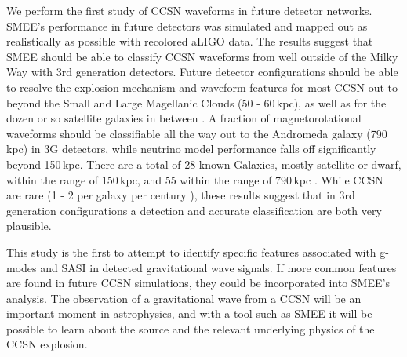 \documentclass[letterpaper, aps, prd, twocolumn, superscriptaddress, showpacs, nofootinbib]{revtex4}
\begin{document}
We perform the first study of CCSN waveforms in future detector networks. SMEE's performance in future detectors was simulated and mapped out as realistically as possible with recolored aLIGO data. The results suggest that SMEE should be able to classify CCSN waveforms from well outside of the Milky Way with 3rd generation detectors. Future detector configurations should be able to resolve the explosion mechanism and waveform features for most CCSN out to beyond the Small and Large Magellanic Clouds (50 - 60\,kpc), as well as for the dozen or so satellite galaxies in between \cite{karachentsev2004catalog, belokurov2007cats}. A fraction of magnetorotational waveforms should be classifiable all the way out to the Andromeda galaxy (790\,kpc) in 3G detectors, while neutrino model performance falls off significantly beyond 150\,kpc. There are a total of 28 known Galaxies, mostly satellite or dwarf, within the range of 150\,kpc, and 55 within the range of 790\,kpc \cite{karachentsev2004catalog, belokurov2007cats}. While CCSN are rare (1 - 2 per galaxy per century \cite{1991ARA&A..29..363V, 1993A&A...273..383C, Alexeyev2002}), these results suggest that in 3rd generation configurations a detection and accurate classification are both very plausible.

This study is the first to attempt to identify specific features associated with g-modes and SASI in detected gravitational wave signals. If more common features are found in future CCSN simulations, they could be incorporated into SMEE's analysis. The observation of a gravitational wave from a CCSN will be an important moment in astrophysics, and with a tool such as SMEE it will be possible to learn about the source and the relevant underlying physics of the CCSN explosion.


\end{document}
